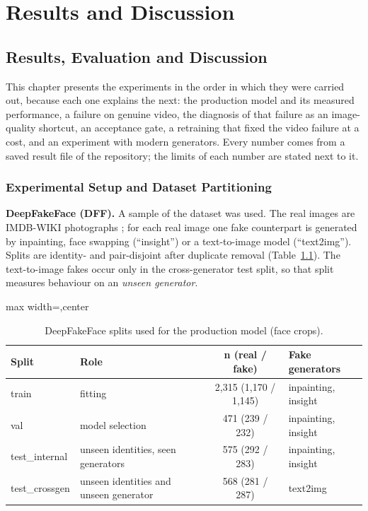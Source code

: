 \chapter{Results and Discussion}
\label{ch:results}

\section{Results, Evaluation and Discussion}
This chapter presents the experiments in the order in which they were carried out, because each one explains the next: the production
model and its measured performance, a failure on genuine video, the diagnosis of that failure as an image-quality shortcut, an acceptance
gate, a retraining that fixed the video failure at a cost, and an experiment with modern generators. Every number comes from a saved result
file of the repository; the limits of each number are stated next to it.

\subsection{Experimental Setup and Dataset Partitioning}
\textbf{DeepFakeFace (DFF).} A sample of the dataset \citep{song2023dff} was used. The real images are IMDB-WIKI photographs
\citep{rothe2018imdbwiki}; for each real image one fake counterpart is generated by inpainting, face swapping (``insight'') or a text-to-image
model (``text2img''). Splits are identity- and pair-disjoint after duplicate removal (Table~\ref{tab:dffsplits}). The text-to-image fakes occur
only in the cross-generator test split, so that split measures behaviour on an \emph{unseen generator}.

\begin{table}[ht]
\centering
\caption{DeepFakeFace splits used for the production model (face crops).}
\label{tab:dffsplits}
\small
\begin{adjustbox}{max width=\linewidth,center}
\begin{tabular}{|l|p{3.4cm}|c|p{3.4cm}|}
\hline
\textbf{Split} & \textbf{Role} & \textbf{n (real / fake)} & \textbf{Fake generators} \\ \hline
train & fitting & 2{,}315 (1{,}170 / 1{,}145) & inpainting, insight \\ \hline
val & model selection & 471 (239 / 232) & inpainting, insight \\ \hline
test\_internal & unseen identities, seen generators & 575 (292 / 283) & inpainting, insight \\ \hline
test\_crossgen & unseen identities and unseen generator & 568 (281 / 287) & text2img \\ \hline
\end{tabular}
\end{adjustbox}
\end{table}

